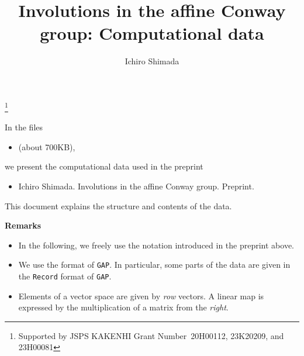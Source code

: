 \documentclass{amsart} %
\begin{document}
\title[[Involutions in the affine Conway group: Computational data]
{Involutions in the affine Conway group: Computational data}


\author{Ichiro Shimada}
\address{Department of Mathematics,
Graduate School of Science,
Hiroshima University,
1-3-1 Kagamiyama,
Higashi-Hiroshima,
739-8526 JAPAN}
\thanks{Supported by JSPS KAKENHI Grant Number~20H00112, 23K20209, and 23H00081}

\maketitle
%
%
% 
In the  files
\begin{itemize}
\item[]   (about 700KB), 
\end{itemize}
 we present  the computational data used in the preprint 
\begin{itemize}
\item []
Ichiro Shimada.  Involutions in the affine {C}onway group. Preprint.
  \end{itemize}
This document explains the structure and contents of the data.
%
\par
{\bf Remarks}
\begin{itemize}
\item
In the following, we freely use the notation introduced in the preprint above.
\item
We use the format of {\tt GAP}.
In particular, 
some parts of the data are given in  the {\tt Record} format of {\tt GAP}.
\item
Elements of a vector space are given by \emph{row} vectors.
A linear map is expressed by the multiplication of a matrix from the \emph{right}.
\end{itemize}
%
\end{document}
